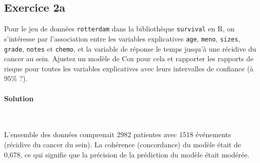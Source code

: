 \documentclass[../main.tex]{subfiles}
\begin{document}
\begin{CJK*}{UTF8}{gbsn}
\section*{Exercice 2a}
Pour le jeu de données 
\texttt{rotterdam} dans la bibliothèque \texttt{survival} en R, 
on s'intéresse par l'association entre les variables explicatives \texttt{age}, \texttt{meno}, 
\texttt{sizes}, \texttt{grade}, \texttt{notes} et \texttt{chemo},
et la variable de réponse le temps jusqu'à une récidive du cancer au sein.
Ajustez un modèle de Cox pour cela et rapporter 
les rapports de risque pour toutes les variables explicatives avec leurs intervalles de confiance (à $95\%$ ?).

\paragraph{Solution}\

L'ensemble des données comprenait 2982 patientes avec 1518 événements (récidive du cancer du sein). La cohérence (concordance) du modèle était de 0,678, ce qui signifie que la précision de la prédiction du modèle était modérée.


\end{CJK*}
\end{document}
